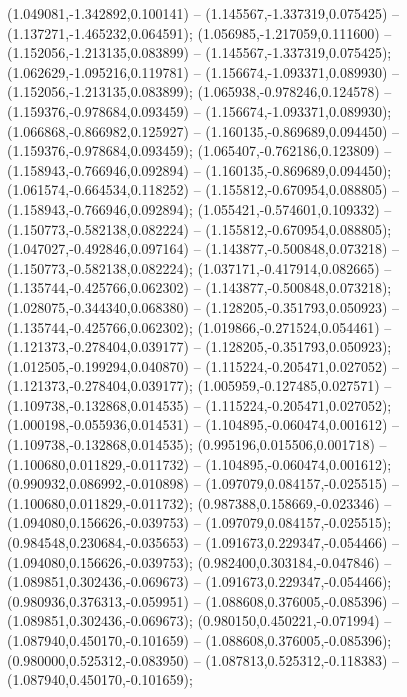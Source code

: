  (1.049081,-1.342892,0.100141) -- (1.145567,-1.337319,0.075425) -- (1.137271,-1.465232,0.064591);
 (1.056985,-1.217059,0.111600) -- (1.152056,-1.213135,0.083899) -- (1.145567,-1.337319,0.075425);
 (1.062629,-1.095216,0.119781) -- (1.156674,-1.093371,0.089930) -- (1.152056,-1.213135,0.083899);
 (1.065938,-0.978246,0.124578) -- (1.159376,-0.978684,0.093459) -- (1.156674,-1.093371,0.089930);
 (1.066868,-0.866982,0.125927) -- (1.160135,-0.869689,0.094450) -- (1.159376,-0.978684,0.093459);
 (1.065407,-0.762186,0.123809) -- (1.158943,-0.766946,0.092894) -- (1.160135,-0.869689,0.094450);
 (1.061574,-0.664534,0.118252) -- (1.155812,-0.670954,0.088805) -- (1.158943,-0.766946,0.092894);
 (1.055421,-0.574601,0.109332) -- (1.150773,-0.582138,0.082224) -- (1.155812,-0.670954,0.088805);
 (1.047027,-0.492846,0.097164) -- (1.143877,-0.500848,0.073218) -- (1.150773,-0.582138,0.082224);
 (1.037171,-0.417914,0.082665) -- (1.135744,-0.425766,0.062302) -- (1.143877,-0.500848,0.073218);
 (1.028075,-0.344340,0.068380) -- (1.128205,-0.351793,0.050923) -- (1.135744,-0.425766,0.062302);
 (1.019866,-0.271524,0.054461) -- (1.121373,-0.278404,0.039177) -- (1.128205,-0.351793,0.050923);
 (1.012505,-0.199294,0.040870) -- (1.115224,-0.205471,0.027052) -- (1.121373,-0.278404,0.039177);
 (1.005959,-0.127485,0.027571) -- (1.109738,-0.132868,0.014535) -- (1.115224,-0.205471,0.027052);
 (1.000198,-0.055936,0.014531) -- (1.104895,-0.060474,0.001612) -- (1.109738,-0.132868,0.014535);
 (0.995196,0.015506,0.001718) -- (1.100680,0.011829,-0.011732) -- (1.104895,-0.060474,0.001612);
 (0.990932,0.086992,-0.010898) -- (1.097079,0.084157,-0.025515) -- (1.100680,0.011829,-0.011732);
 (0.987388,0.158669,-0.023346) -- (1.094080,0.156626,-0.039753) -- (1.097079,0.084157,-0.025515);
 (0.984548,0.230684,-0.035653) -- (1.091673,0.229347,-0.054466) -- (1.094080,0.156626,-0.039753);
 (0.982400,0.303184,-0.047846) -- (1.089851,0.302436,-0.069673) -- (1.091673,0.229347,-0.054466);
 (0.980936,0.376313,-0.059951) -- (1.088608,0.376005,-0.085396) -- (1.089851,0.302436,-0.069673);
 (0.980150,0.450221,-0.071994) -- (1.087940,0.450170,-0.101659) -- (1.088608,0.376005,-0.085396);
 (0.980000,0.525312,-0.083950) -- (1.087813,0.525312,-0.118383) -- (1.087940,0.450170,-0.101659);
